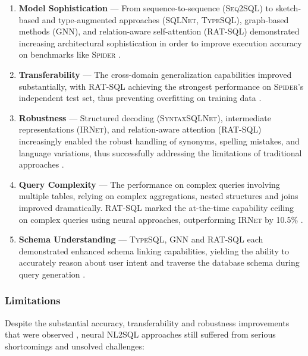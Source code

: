 \begin{enumerate}
    \item \textbf{Model Sophistication} — From sequence-to-sequence
        (\textsc{Seq2SQL}) to sketch-based and type-augmented approaches
        (\textsc{SQLNet}, \textsc{TypeSQL}), graph-based methods
        (\textsc{GNN}), and relation-aware self-attention (\textsc{RAT-SQL})
        demonstrated increasing architectural sophistication in order to
        improve execution accuracy on benchmarks like \textsc{Spider}
        \citep{Seq2SQL, SQLNet, TypeSQL, GNN, SyntaxSQLNet, RATSQL}.
    \item \textbf{Transferability} — The cross-domain generalization
        capabilities improved substantially, with RAT-SQL achieving the
        strongest performance on \textsc{Spider}'s independent test set,
        thus preventing overfitting on training data \citep{RATSQL}.
    \item \textbf{Robustness} — Structured decoding (\textsc{SyntaxSQLNet}),
        intermediate representations (\textsc{IRNet}), and relation-aware
        attention (\textsc{RAT-SQL}) increasingly enabled the robust handling
        of synonyms, spelling mistakes, and language variations, thus
        successfully addressing the limitations of traditional approaches
        \citep{SyntaxSQLNet, IRNet, RATSQL}.
    \item \textbf{Query Complexity} — The performance on complex queries
        involving multiple tables, relying on complex aggregations, nested
        structures and joins improved dramatically. \textsc{RAT-SQL} marked the
        at-the-time capability ceiling on complex queries using neural
        approaches, outperforming \textsc{IRNet} by 10.5\% \citep{IRNet,
        RATSQL}.
    \item \textbf{Schema Understanding} — \textsc{TypeSQL}, \textsc{GNN} and
        \textsc{RAT-SQL} each demonstrated enhanced schema linking
        capabilities, yielding the ability to accurately reason about user
        intent and traverse the database schema during query generation
        \citep{TypeSQL, GNN, RATSQL}.
\end{enumerate}

\subsubsection{Limitations}

Despite the substantial accuracy, transferability and robustness improvements
that were observed \citep{IRNet, RATSQL}, neural NL2SQL approaches still
suffered from serious shortcomings and unsolved challenges:

